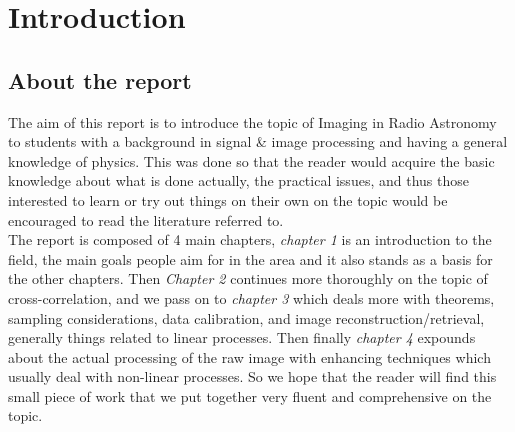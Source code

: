
\chapter{Introduction} %

\label{Chapter1} %



\section{About the report}
\label{sec:about}
The aim of this report is to introduce the topic of Imaging in Radio Astronomy to students with a background in signal \& image processing and having a general knowledge of physics. This was done so that the reader would acquire the basic knowledge about what is done actually, the practical issues, and thus those interested to learn or try out things on their own on the topic would be encouraged to read the literature referred to.\\

The report is composed of 4 main chapters,
\textit{chapter 1} is an introduction to the field, the main goals people aim for in the area and it also stands as a basis for the other chapters. Then \textit{Chapter 2} continues more thoroughly on the topic of cross-correlation, and we pass on to \textit{chapter 3} which deals more with theorems, sampling considerations, data calibration, and image reconstruction/retrieval, generally things related to linear processes. Then finally \textit{chapter 4} expounds about the actual processing of the raw image with enhancing techniques which usually deal with non-linear processes. So we hope that the reader will find this small piece of work that we put together very fluent and comprehensive on the topic.


